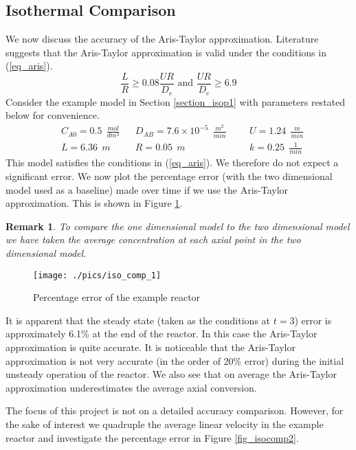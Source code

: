 \documentclass[11pt,fleqn]{article}
\theoremstyle{defstyle}
\newtheorem{rmrk}{Remark}[section]
\begin{document}
\subsection{Isothermal Comparison}
We now discuss the accuracy of the Aris-Taylor approximation. Literature \cite{washington} suggests that the Aris-Taylor approximation is valid under the conditions in (\ref{eq_aris}).
\begin{equation}
\frac{L}{R} \geq 0.08\frac{UR}{D_e} \text{ and } \frac{UR}{D_e} \geq 6.9
\label{eq_aris}
\end{equation}
Consider the example model in Section \ref{section_isop1} with parameters restated below for convenience.
\begin{equation*}
\begin{aligned}
&C_{A0} = 0.5~~ \frac{mol}{dm^3}
&&D_{AB} = 7.6\times 10^{-5} ~~\frac{m^2}{min}
&&&U = 1.24~~ \frac{m}{min} \\
&L = 6.36~~ m 
&&R = 0.05~~ m
&&&k = 0.25~~ \frac{1}{min} 
\end{aligned}
\end{equation*}
This model satisfies the conditions in (\ref{eq_aris}). We therefore do not expect a significant error. We now plot the percentage error (with the two dimensional model used as a baseline) made over time if we use the Aris-Taylor approximation. This is shown in Figure \ref{fig_isocomp1}.
\begin{rmrk}
To compare the one dimensional model to the two dimensional model we have taken the average concentration at each axial point in the two dimensional model.
\end{rmrk}
\begin{figure}[H] 
\centering
\texttt{[image: ./pics/iso\_comp\_1]}
\caption{Percentage error of the example reactor} 
\label{fig_isocomp1}
\end{figure}
It is apparent that the steady state (taken as the conditions at $t=3$) error is approximately 6.1\% at the end of the reactor. In this case the Aris-Taylor approximation is quite accurate. It is noticeable that the Aris-Taylor approximation is not very accurate (in the order of 20\% error) during the initial unsteady operation of the reactor. We also see that on average the Aris-Taylor approximation underestimates the average axial conversion. 

The focus of this project is not on a detailed accuracy comparison. However, for the sake of interest we quadruple the average linear velocity in the example reactor and investigate the percentage error in Figure \ref{fig_isocomp2}.
\end{document}
